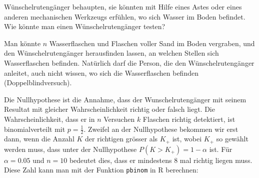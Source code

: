 Wünschelrutengänger behaupten, sie könnten mit Hilfe eines Astes
oder eines anderen mechanischen Werkzeugs erfühlen, wo sich Wasser
im Boden befindet. Wie könnte man einen Wünschelrutengänger testen?


\begin{loesung}
Man könnte $n$ Wasserflaschen und Flaschen voller Sand im Boden vergraben,
und den Wünschelrutengänger herausfinden lassen, an welchen Stellen
sich Wasserflaschen befinden. Natürlich darf die Person, die den
Wünschelrutengänger anleitet, auch nicht wissen, wo sich die
Wasserflaschen befinden (Doppelblindversuch).

Die Nullhypothese ist die Annahme, dass der Wunschelrutengänger mit
seinem Resultat mit
gleicher Wahrscheinlichkeit richtig oder falsch liegt.
Die Wahrscheinlichkeit, dass er  in $n$ Versuchen
$k$ Flaschen richtig detektiert, ist
binomialverteilt mit $p=\frac12$.
Zweifel an der Nullhypothese bekommen wir erst
dann, wenn die Anzahl $K$ der richtigen grösser als $K_+$ ist, wobei
$K_+$ so gewählt werden muss, dass unter der Nullhypothese
$P(K>K_+)=1-\alpha$ ist. Für $\alpha=0.05$ und $n=10$ bedeutet
dies, dass er mindestens 8 mal richtig liegen muss. Diese Zahl
kann man mit der Funktion {\tt pbinom} in R berechnen:
\end{loesung}

